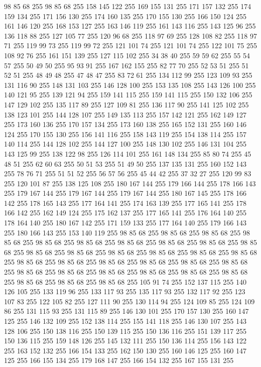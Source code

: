 98 85 68 255 98 85 68 255 158 145 122 255 169 155 131 255 171 157 132 255 174 159 134 255 171 156 130 255 174 160 135 255 170 155 130 255 166 150 124 255 161 146 120 255 168 153 127 255 163 146 119 255 161 143 116 255 143 125 96 255 136 118 88 255 127 105 77 255 120 96 68 255 118 97 69 255 128 108 82 255 118 97 71 255 119 99 73 255 119 99 72 255 121 101 74 255 121 101 74 255 122 101 75 255 108 92 76 255 161 151 139 255 127 115 102 255 34 38 40 255 59 59 62 255 55 54 57 255 50 49 50 255 95 93 91 255 167 162 155 255 82 77 70 255 52 53 51 255 51 52 51 255 48 49 48 255 47 48 47 255 83 72 61 255 134 112 99 255 123 109 93 255 131 116 90 255 148 131 103 255 146 128 100 255 153 135 108 255 143 126 100 255 140 121 95 255 139 121 94 255 159 141 115 255 159 141 115 255 150 132 106 255 147 129 102 255 135 117 89 255 127 109 81 255 136 117 90 255 141 125 102 255 138 123 101 255 144 128 107 255 149 135 113 255 157 142 121 255 162 149 127 255 173 160 136 255
170 157 134 255 173 160 138 255 165 152 131 255 160 146 124 255 170 155 130 255 156 141 116 255 158 143 119 255 154 138 114 255 157 140 114 255 144 128 102 255 144 127 100 255 148 130 102 255 146 131 104 255 143 125 99 255 138 122 98 255 126 114 101 255 161 148 134 255 85 80 74 255 45 48 51 255 62 60 63 255 50 51 53 255 51 49 50 255 137 135 131 255 160 152 143 255 78 76 71 255 51 51 52 255 56 57 56 255 45 44 42 255 37 32 27 255 120 99 83 255 120 101 87 255 138 125 108 255 180 167 144 255 179 166 144 255 178 166 143 255 179 167 144 255 179 167 144 255 179 167 144 255 180 167 145 255 178 166 142 255 178 165 143 255 177 164 141 255 174 163 139 255 177 165 141 255 178 166 142 255 162 149 124 255 175 162 137 255 177 165 141 255 176 164 140 255 178 164 140 255 180 167 142 255 171 159 133 255 177 164 140 255 179 166 143 255 180 166 143 255 153 140 119 255 98 85 68 255 98 85 68 255 98 85 68 255 98 85 68 255 98 85 68 255 98 85 68 255 98 85 68 255 98 85 68 255
98 85 68 255 98 85 68 255 98 85 68 255 98 85 68 255 98 85 68 255 98 85 68 255 98 85 68 255 98 85 68 255 98 85 68 255 98 85 68 255 98 85 68 255 98 85 68 255 98 85 68 255 98 85 68 255 98 85 68 255 98 85 68 255 98 85 68 255 98 85 68 255 98 85 68 255 98 85 68 255 98 85 68 255 98 85 68 255 98 85 68 255 105 91 74 255 152 137 115 255 140 126 105 255 133 119 96 255 133 117 93 255 135 117 93 255 132 117 92 255 123 107 83 255 122 105 82 255 127 111 90 255 130 114 94 255 124 109 85 255 124 109 86 255 131 115 93 255 131 115 89 255 146 130 101 255 170 157 130 255 160 147 125 255 146 132 109 255 152 138 114 255 155 141 118 255 146 130 107 255 143 128 106 255 150 138 116 255 150 139 115 255 150 136 116 255 151 139 117 255 150 136 115 255 159 148 126 255 145 132 111 255 150 136 114 255 156 143 122 255 163 152 132 255 166 154 133 255 162 150 130 255 160 146 125 255 160 147 125 255 166 155 134 255 179 168 147 255 166 154 132 255 167 155 131 255
